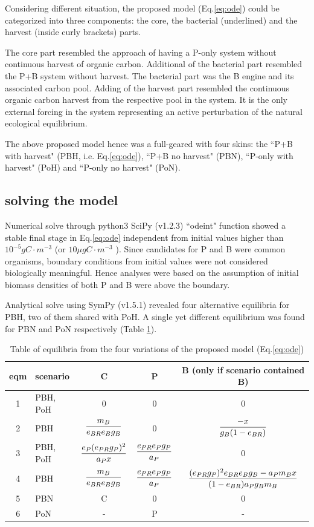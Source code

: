 \documentclass[../thesis.tex]{subfiles} %
\begin{document}
Considering different situation, the proposed model (Eq.\ref{eq:ode}) could be categorized into three components: the core, the bacterial (underlined) and the harvest (inside curly brackets) parts.

The core part resembled the approach of having a P-only system without continuous harvest of organic carbon.  Additional of the bacterial part resembled the P+B system without harvest.  The bacterial part was the B engine and its associated carbon pool.  Adding of the harvest part resembled the continuous organic carbon harvest from the respective pool in the system.  It is the only external forcing in the system representing an active perturbation of the natural ecological equilibrium.

The above proposed model hence was a full-geared with four skins: the ``P+B with harvest" (PBH, i.e. Eq.\ref{eq:ode}), ``P+B no harvest" (PBN), ``P-only with harvest" (PoH) and ``P-only no harvest" (PoN).

\subsection{solving the model}
Numerical solve through python3\autocite{van1995python} SciPy (v1.2.3)\autocite{virtanen2020scipy} ``odeint" function showed a stable final stage in Eq.\ref{eq:ode} independent from initial values higher than $10^{-5}gC\cdot m^{-3}$ (or $10\mu gC\cdot m^{-3}$ ).  Since candidates for P and B were common organisms, boundary conditions from initial values were not considered biologically meaningful.  Hence analyses were based on the assumption of initial biomass densities of both P and B were above the boundary.

Analytical solve using SymPy (v1.5.1)\autocite{meurer2017sympy} revealed four alternative equilibria for PBH, two of them shared with PoH.  A single yet different equilibrium was found for PBN and PoN respectively (Table \ref{tab:eqm}).

\begin{table}[H]
    \centering
    \caption{Table of equilibria from the four variations of the proposed model (Eq.\ref{eq:ode})}
    \begin{tabular}{cl|ccc}\hline
        eqm & scenario & C & P & B (only if scenario contained B) \\\hline
        1 & PBH, PoH & 0 & 0 & 0 \\
        2 & PBH & $\dfrac{m_B}{e_{BR}e_Bg_B}$ & 0 & $\dfrac{-x}{g_B(1-e_{BR})}$ \\
        3 & PBH, PoH & $\dfrac{e_P(e_{PR}g_P)^2}{a_P x}$ & $\dfrac{e_{PR}e_Pg_P}{a_P}$ & 0 \\
        4 & PBH & $\dfrac{m_B}{e_{BR}e_Bg_B}$ & $\dfrac{e_{PR}e_Pg_P}{a_P}$ & $\dfrac{(e_{PR}g_P)^2e_{BR}e_Bg_B-a_Pm_B x}{(1-e_{BR})a_Pg_Bm_B}$ \\
        5 & PBN & C & 0 & 0 \\
        6 & PoN & - & P & - \\\hline
    \end{tabular}
    \label{tab:eqm}
\end{table}
\end{document}
